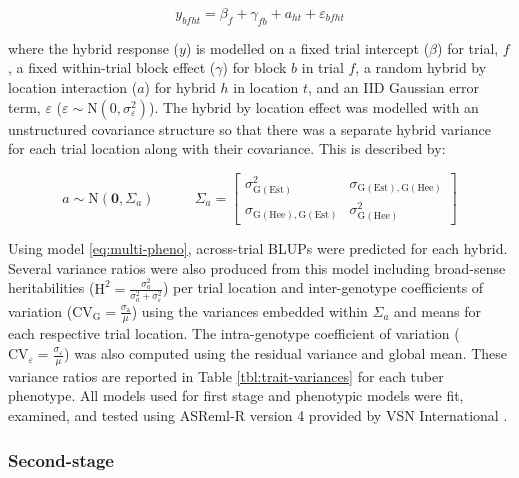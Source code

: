 \begin{equation}
y_{bfht} = \beta_f +\gamma_{fb} + a_{ht} + \varepsilon_{bfht} 
\label{eq:multi-pheno}
\end{equation}

where the hybrid response (\(y\)) is modelled on a fixed trial intercept (\(\beta\)) for trial, \(f\), a fixed within-trial block effect (\(\gamma\)) for block \(b\) in trial \(f\), a random hybrid by location interaction (\(a\)) for hybrid \(h\) in location \(t\), and an IID Gaussian error term, \(\varepsilon\) (\(\varepsilon \sim \mathrm{N} \left ( 0, \sigma_{\varepsilon}^2 \right )\)). The hybrid by location effect was modelled with an unstructured covariance structure so that there was a separate hybrid variance for each trial location along with their covariance. This is described by:

\[ a \sim \mathrm{N} \left (\mathbf{0},  \Sigma_a \right )  ~~~~~~~~~~~~~  \Sigma_a =\begin{bmatrix} \sigma^2_{\mathrm{G(Est)}} &  \sigma_{\mathrm{G(Est),G(Hee)}}\\ \sigma_{\mathrm{G(Hee),G(Est)}} & \sigma^2_{\mathrm{G(Hee)}}\end{bmatrix}  \]

Using model \eqref{eq:multi-pheno}, across-trial BLUPs were predicted for each hybrid. Several variance ratios were also produced from this model including broad-sense heritabilities (\(\mathrm H^2 = \frac{\sigma^2_{a}}{\sigma^2_{a} + \sigma^2_\varepsilon}\)) per trial location and inter-genotype coefficients of variation (\(\mathrm{CV_{G}} = \frac{\sigma_{\mathrm a}}{\mu}\)) using the variances embedded within \(\Sigma_a\) and means for each respective trial location. The intra-genotype coefficient of variation (\(\mathrm{CV}_\varepsilon = \frac{\sigma_\varepsilon}{\mu}\)) was also computed using the residual variance and global mean. These variance ratios are reported in Table \ref{tbl:trait-variances} for each tuber phenotype. All models used for first stage and phenotypic models were fit, examined, and tested using ASReml-R version 4 provided by VSN International \parencite{Butler2017}.

\subsubsection{Second-stage}

